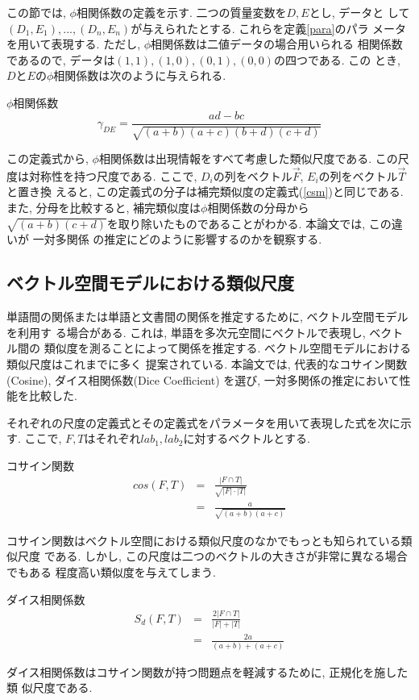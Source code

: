 この節では, $\phi$相関係数の定義を示す. 二つの質量変数を$D,E$とし, データと
して$(D_1,E_1), ..., (D_n,E_n)$が与えられたとする. これらを定義\ref{para}のパラ
メータを用いて表現する. ただし, $\phi$相関係数は二値データの場合用いられる
相関係数であるので, データは$(1,1),(1,0),(0,1),(0,0)$の四つである. この
とき, $D$と$E$の$\phi$相関係数は次のように与えられる. 
\begin{df} $\phi$相関係数
\begin{equation}
\gamma_{DE} = \frac{a d-b c}{\sqrt{(a+b)(a+c)(b+d)(c+d)}} 
\label{phi}
\end{equation}
\end{df}
この定義式から, $\phi$相関係数は出現情報をすべて考慮した類似尺度である. 
この尺度は対称性を持つ尺度である. 
ここで, $D_i$の列をベクトル$\vec{F}$, $E_i$の列をベクトル$\vec{T}$と置き換
えると, この定義式の分子は補完類似度の定義式(\ref{csm})と同じである. 
また, 分母を比較すると, 補完類似度は$\phi$相関係数の分母から
$\sqrt{(a+b)(c+d)}$を取り除いたものであることがわかる. 
本論文では, この違いが
一対多関係
の推定にどのように影響するのかを観察する. 

\subsection{ベクトル空間モデルにおける類似尺度}
単語間の関係または単語と文書間の関係を推定するために, ベクトル空間モデルを利用す
る場合がある. 
これは, 単語を多次元空間にベクトルで表現し, ベクトル間の
類似度を測ることによって関係を推定する. 
ベクトル空間モデルにおける類似尺度はこれまでに多く
提案されている\cite{Manning99}. 本論文では, 
代表的なコサイン関数(Cosine), ダイス相関係数(Dice Coefficient)
を選び, 一対多関係の推定において性能を比較した. 

それぞれの尺度の定義式とその定義式をパラメータを用いて表現した式を次に示す. 
ここで, $F,T$はそれぞれ$lab_1,lab_2$に対するベクトルとする. 
\begin{df} コサイン関数
\begin{eqnarray}
cos(F,T) &=& \frac{| F \cap T|}{\sqrt{| F| \cdot | T|}} \nonumber\\
&=& \frac{a}{\sqrt{(a+b)(a+c)}}
\end{eqnarray}
\end{df}
コサイン関数はベクトル空間における類似尺度のなかでもっとも知られている類似尺度
である. しかし, この尺度は二つのベクトルの大きさが非常に異なる場合でもある
程度高い類似度を与えてしまう. 
\begin{df} ダイス相関係数
\begin{eqnarray}
S_d(F,T) &=& \frac{2| F \cap T|}{| F| +| T|} \nonumber\\
&=& \frac{2a}{(a+b)+(a+c)}
\end{eqnarray}
\end{df}
ダイス相関係数はコサイン関数が持つ問題点を軽減するために, 正規化を施した類
似尺度である. 

